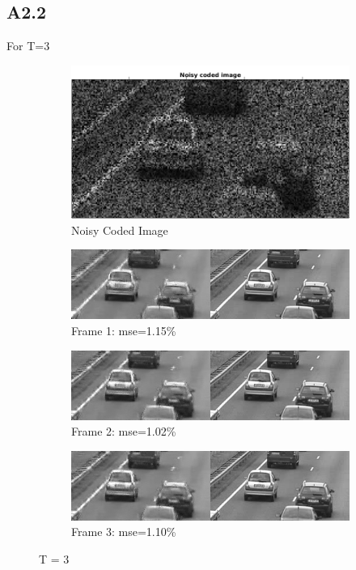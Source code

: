 \documentclass{article}
\begin{document}
\subsection*{A2.2}
For T=3
\begin{figure}[H]
  \centering

  \begin{subfigure}[t]{1.0\linewidth}
    \centering
    \includegraphics[scale=0.25]{images/noisy_coded_img}
    \caption{Noisy Coded Image}
  \end{subfigure}
  
  
  \begin{subfigure}[t]{1.0\linewidth}
    \centering
    \includegraphics[scale=0.5]{images/frame_1}
      \caption{Frame 1: mse=1.15\%}
  \end{subfigure}
  
  \begin{subfigure}[t]{1.0\linewidth}
    \centering
    \includegraphics[scale=0.5]{images/frame_2}
      \caption{Frame 2: mse=1.02\%}
  \end{subfigure}
  
  \begin{subfigure}[t]{1.0\linewidth}
    \centering
    \includegraphics[scale=0.5]{images/frame_2}
    \caption{Frame 3: mse=1.10\%}
  \end{subfigure}
  
  \caption{T = 3}
  \label{fig:1}
\end{figure}
\end{document}
